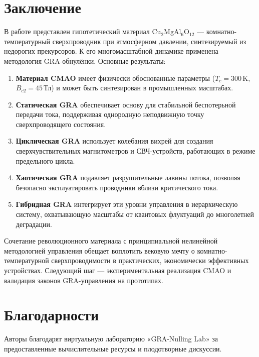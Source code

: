 \documentclass[12pt,a4paper]{article}
\numberwithin{equation}{section}
\begin{document}
\section{Заключение}
\label{sec:conclusion}

В работе представлен гипотетический материал Cu$_2$MgAl$_6$O$_{12}$ — комнатно-температурный сверхпроводник при атмосферном давлении, синтезируемый из недорогих прекурсоров. К его многомасштабной динамике применена методология GRA-обнулёнки. Основные результаты:

\begin{enumerate}
    \item \textbf{Материал CMAO} имеет физически обоснованные параметры ($T_c = 300$\,K, $B_{c2}=45$\,Тл) и может быть синтезирован в промышленных масштабах.
    \item \textbf{Статическая GRA} обеспечивает основу для стабильной беспотерьной передачи тока, поддерживая однородную неподвижную точку сверхпроводящего состояния.
    \item \textbf{Циклическая GRA} использует колебания вихрей для создания сверхчувствительных магнитометров и СВЧ-устройств, работающих в режиме предельного цикла.
    \item \textbf{Хаотическая GRA} подавляет разрушительные лавины потока, позволяя безопасно эксплуатировать проводники вблизи критического тока.
    \item \textbf{Гибридная GRA} интегрирует эти уровни управления в иерархическую систему, охватывающую масштабы от квантовых флуктуаций до многолетней деградации.
\end{enumerate}

Сочетание революционного материала с принципиальной нелинейной методологией управления обещает воплотить вековую мечту о комнатно-температурной сверхпроводимости в практических, экономически эффективных устройствах. Следующий шаг — экспериментальная реализация CMAO и валидация законов GRA-управления на прототипах.

\section*{Благодарности}
Авторы благодарят виртуальную лабораторию «GRA-Nulling Lab» за предоставленные вычислительные ресурсы и плодотворные дискуссии.
\end{document}
